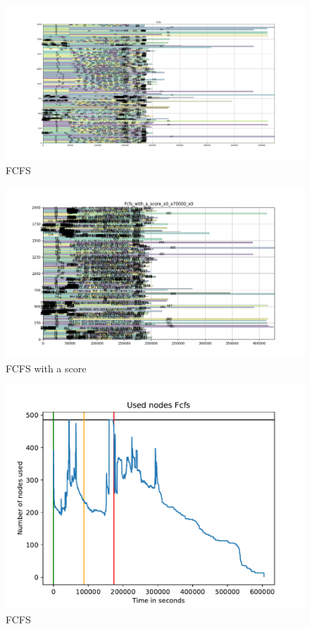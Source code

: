 \documentclass[a4paper]{article}
\begin{document}
\begin{figure}[H]\centering\includegraphics[width=1\linewidth]{MBSS/plot/Gantt_charts/Fcfs.png}\caption{FCFS}\end{figure}
\begin{figure}[H]\centering\includegraphics[width=1\linewidth]{MBSS/plot/Gantt_charts/Fcfs_with_a_score_x0_x70000_x0.png}\caption{FCFS with a score}\end{figure}
\begin{figure}[H]\centering\includegraphics[width=1\linewidth]{MBSS/plot/plot_1.pdf}\caption{FCFS}\end{figure}
\end{document}
